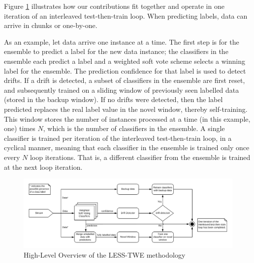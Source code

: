 \documentclass[runningheads]{llncs}
\begin{document}
Figure \ref{fig:prequential_loop} illustrates how our contributions fit together and operate in one iteration of an interleaved test-then-train loop.
When predicting labels, data can arrive in chunks or one-by-one. 

As an example, let data arrive one instance at a time. The first step is for the ensemble to predict a label for the new data instance; the classifiers in the ensemble each predict a label and a weighted soft vote scheme selects a winning label for the ensemble. The prediction confidence for that label is used to detect drifts. If a drift is detected, a subset of classifiers in the ensemble are first reset, and subsequently trained on a sliding window of previously seen labelled data (stored in the backup window). If no drifts were detected, then the label predicted replaces the real label value in the novel window, thereby self-training. This window stores the number of instances processed at a time (in this example, one) times $N$, which is the number of classifiers in the ensemble. A single classifier is trained per iteration of the interleaved test-then-train loop, in a cyclical manner, meaning that each classifier in the ensemble is trained only once every $N$ loop iterations. That is, a different classifier from the ensemble is trained at the next loop iteration.

\begin{figure}
  \includegraphics[width=\linewidth]{./images/chapter3/prequential_loop}
\caption{\label{fig:prequential_loop}High-Level Overview of the LESS-TWE methodology}
\end{figure}
\end{document}
